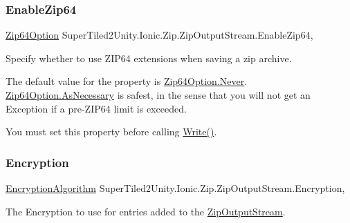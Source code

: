 \subsubsection{\texorpdfstring{Enable\+Zip64}{EnableZip64}}
{\footnotesize\ttfamily \mbox{\hyperlink{namespace_super_tiled2_unity_1_1_ionic_1_1_zip_a0c873ba2a5b73de966e876643830dc69}{Zip64\+Option}} Super\+Tiled2\+Unity.\+Ionic.\+Zip.\+Zip\+Output\+Stream.\+Enable\+Zip64\hspace{0.3cm}{\ttfamily [get]}, {\ttfamily [set]}}



Specify whether to use Z\+I\+P64 extensions when saving a zip archive. 

The default value for the property is \mbox{\hyperlink{namespace_super_tiled2_unity_1_1_ionic_1_1_zip_a0c873ba2a5b73de966e876643830dc69a6e7b34fa59e1bd229b207892956dc41c}{Zip64\+Option.\+Never}}. \mbox{\hyperlink{namespace_super_tiled2_unity_1_1_ionic_1_1_zip_a0c873ba2a5b73de966e876643830dc69a7bfa2d7f3d5b79692fe22a06113406c8}{Zip64\+Option.\+As\+Necessary}} is safest, in the sense that you will not get an Exception if a pre-\/\+Z\+I\+P64 limit is exceeded. 

You must set this property before calling {\ttfamily \mbox{\hyperlink{class_super_tiled2_unity_1_1_ionic_1_1_zip_1_1_zip_output_stream_a8cd95df92691b8f266216f1d6984dfec}{Write()}}}. \mbox{\label{class_super_tiled2_unity_1_1_ionic_1_1_zip_1_1_zip_output_stream_af1e123174110807666b7c4df62959112}} 
\subsubsection{\texorpdfstring{Encryption}{Encryption}}
{\footnotesize\ttfamily \mbox{\hyperlink{namespace_super_tiled2_unity_1_1_ionic_1_1_zip_aa3f4e8aa12ef827ac72177a49b4e28e6}{Encryption\+Algorithm}} Super\+Tiled2\+Unity.\+Ionic.\+Zip.\+Zip\+Output\+Stream.\+Encryption\hspace{0.3cm}{\ttfamily [get]}, {\ttfamily [set]}}



The Encryption to use for entries added to the {\ttfamily \mbox{\hyperlink{class_super_tiled2_unity_1_1_ionic_1_1_zip_1_1_zip_output_stream}{Zip\+Output\+Stream}}}. 

